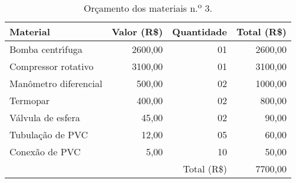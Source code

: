 \begin{table}[Htb]%
\caption{Or\c{c}amento dos materiais n.\textsuperscript{o} 3.}%
\label{tab:tab5}%
\begin{tabularx}{\textwidth}{@{\extracolsep{\fill}}lrrr}%
\toprule
Material              & \multicolumn{1}{c}{Valor (R\$)} & \multicolumn{1}{c}{Quantidade}  & \multicolumn{1}{c}{Total (R\$)} \\ \midrule
Bomba centr\'{\i}fuga      & 2600,00                         & 01                              & 2600,00                         \\
Compressor rotativo   & 3100,00                         & 01                              & 3100,00                         \\
Man\^ometro diferencial & 500,00                          & 02                              & 1000,00                         \\
Termopar              & 400,00                          & 02                              & 800,00                          \\
V\'alvula de esfera     & 45,00                           & 02                              & 90,00                           \\
Tubula\c{c}\~ao de PVC      & 12,00                           & 05                              & 60,00                           \\
Conex\~ao de PVC        & 5,00                            & 10                              & 50,00                           \\ \midrule
                      &                                 & \multicolumn{1}{r}{Total (R\$)} & 7700,00                         \\ \bottomrule
\end{tabularx}
\end{table}
